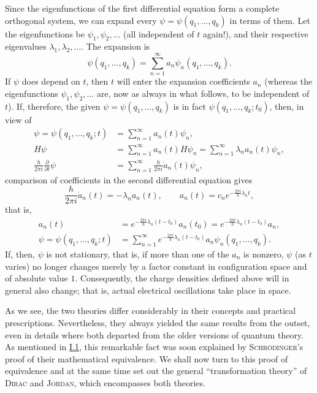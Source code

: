 \documentclass[fontsize=13pt,twoside,openany,headings=normal,parskip=false,bookmarkpackage=false,DIV=calc]{scrbook}
\begin{document}
Since the eigenfunctions of the first differential equation form a complete orthogonal system, we can expand every $\psi=\psi(q_1,\ldots,q_k)$ in terms of them. Let the eigenfunctions be $\psi_1,\psi_2,\ldots$ (all independent of $t$ again!), and their respective eigenvalues $\lambda_1,\lambda_2,\ldots$. The expansion is
\[
 \psi(q_1,\ldots,q_k)=\sum_{n=1}^{\infty}a_n\psi_n(q_1,\ldots,q_k).
\]
If $\psi$ does depend on $t$, then $t$ will enter the expansion coefficients $a_n$ (whereas the eigenfunctions $\psi_1,\psi_2,\ldots$ are, now as always in what follows, to be independent of $t$). If, therefore, the given $\psi=\psi(q_1,\ldots,q_k)$ is in fact $\psi(q_1,\ldots,q_k;t_0)$, then, in view of
\begin{align*}
 \psi=\psi(q_1,\ldots,q_k;t)&=\sum_{n=1}^{\infty}a_n(t)\psi_n,\\
 H\psi&=\sum_{n=1}^{\infty}a_n(t)H\psi_n
       =\sum_{n=1}^{\infty}\lambda_na_n(t)\psi_n,\\
 \frac{h}{2\pi i}\frac{\partial}{\partial t}\psi
   &=\sum_{n=1}^{\infty}\frac{h}{2\pi i}\dot a_n(t)\psi_n,
\end{align*}
comparison of coefficients in the second differential equation gives
\[
 \frac{h}{2\pi i}\dot a_n(t)=-\lambda_na_n(t),\qquad
 a_n(t)=c_ne^{-\frac{2\pi i}{h}\lambda_nt},
\]
that is,
\begin{align*}
 a_n(t)&=e^{-\frac{2\pi i}{h}\lambda_n(t-t_0)}a_n(t_0)
        =e^{-\frac{2\pi i}{h}\lambda_n(t-t_0)}a_n,\\
 \psi=\psi(q_1,\ldots,q_k;t)
   &=\sum_{n=1}^{\infty}e^{-\frac{2\pi i}{h}\lambda_n(t-t_0)}
     a_n\psi_n(q_1,\ldots,q_k).
\end{align*}
If, then, $\psi$ is not stationary, that is, if more than one of the $a_n$ is nonzero, $\psi$ (as $t$ varies) no longer changes merely by a factor constant in configuration space and of absolute value $1$. Consequently, the charge densities defined above will in general also change; that is, actual electrical oscillations take place in space.
\hypertarget{origpage-10}{}%

As we see, the two theories differ considerably in their concepts and practical prescriptions. Nevertheless, they always yielded the same results from the outset, even in details where both departed from the older versions of quantum theory. As mentioned in \hyperref[sec:I.1]{I.1}, this remarkable fact was soon explained by \textsc{Schrödinger}'s proof of their mathematical equivalence. We shall now turn to this proof of equivalence and at the same time set out the general ``transformation theory'' of \textsc{Dirac} and \textsc{Jordan}, which encompasses both theories.
\end{document}
